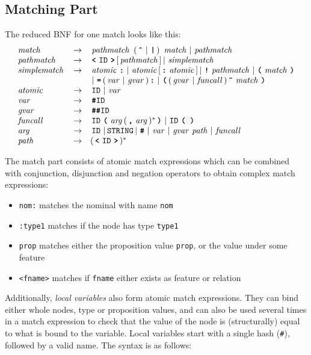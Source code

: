 \documentclass[11pt,a4paper]{article}
\newcommand{\cd}[1]{\texttt{#1}}
\begin{document}
\subsection{Matching Part}
\label{matching_part}
The reduced BNF for one match looks like this:
\[
\begin{array}{lcl}
\nt{match} & \rightarrow &
  \nt{pathmatch}\ (\tok{\^{}} \BAR  \tok{|} )\  \nt{match} \BAR
  \nt{pathmatch}\\
\nt{pathmatch} & \rightarrow &
  \tok{<} \id \tok{>} [ \nt{pathmatch} ] \BAR \nt{simplematch}\\
\nt{simplematch} & \rightarrow &
  \nt{atomic} \tok{:} \BAR
  \nt{atomic} [ \tok{:} \nt{atomic} ] \BAR
  \tok{!} \nt{pathmatch} \BAR
  \tok{(} \nt{match} \tok{)}\\
& & \BAR \tok{=} ( \nt{var} \BAR \nt{gvar} ) \tok{:} \BAR
    \tok{(} ( \nt{gvar} \BAR \nt{funcall} ) \tok{\~} \nt{match} \tok{)}\\
\nt{atomic} & \rightarrow & \id \BAR \nt{var}\\
\nt{var} & \rightarrow & \tok{\#}\!\!\id \\
\nt{gvar}  & \rightarrow & \tok{\#\#}\!\!\id \\
\nt{funcall} & \rightarrow &
  \id \tok{(} \nt{arg} (\tok{,} \nt{arg})^{*} \tok{)} \BAR
  \id \tok{( )} \\
\nt{arg} & \rightarrow &
  \id \BAR \mbox{\texttt{STRING}} \BAR \tok{\#} \BAR \nt{var}
  \BAR \nt{gvar} \nt{path} \BAR \nt{funcall}\\
\nt{path} & \rightarrow & (\tok{<} \id \tok{>})^{*}\\
\end{array}
\]

The match part consists of atomic match expressions which can be combined with
conjunction, disjunction and negation operators to obtain complex match
expressions:

\begin{itemize}
\item \cd{nom:} matches the nominal with name \cd{nom}
\item \cd{:type1} matches if the node has type \cd{type1}
\item \cd{prop} matches either the proposition value \cd{prop}, or the value
  under some feature
\item \cd{<fname>} matches if \cd{fname} either exists as feature or
  relation
\end{itemize}

Additionally, \emph{local variables} also form atomic match expressions. They
can bind either whole nodes, type or proposition values, and can also be used
several times in a match expression to check that the value of the node is
(structurally) equal to what is bound to the variable. Local variables start
with a single hash (\cd{\#}), followed by a valid name. The syntax is as
follows:
\end{document}

